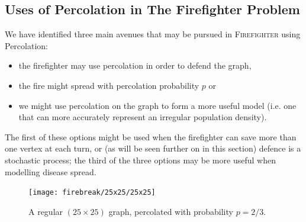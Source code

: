 \documentclass[../report.tex]{subfiles}
\begin{document}
\subsection{Uses of Percolation in The Firefighter Problem}

We have identified three main avenues that may be pursued in {\scshape Firefighter} using Percolation: 
\begin{itemize}
	\item the firefighter may use percolation in order to defend the graph,
	\item the fire might spread with percolation probability $p$ or
	\item we might use percolation on the graph to form a more useful model (i.e. one that can more accurately represent an irregular population density).
\end{itemize}
The first of these options might be used when the firefighter can save more than one vertex at each turn, or (as will be seen further on in this section) defence is a stochastic process; the third of the three options may be more useful when modelling disease spread.
\begin{figure}[ht]
	\centering
		\texttt{[image: firebreak/25x25/25x25]}
	\caption{A regular $(25\times25)$ graph, percolated with probability $p=2/3$.}
	\label{fig:largeperc}
\end{figure}

\end{document}
